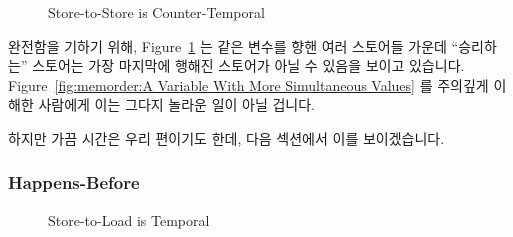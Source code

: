 \begin{figure}[tbp]
\centering
{}
\caption{Store-to-Store is Counter-Temporal}
\label{fig:memorder:Store-to-Store is Counter-Temporal}
\end{figure}

완전함을 기하기 위해,
Figure~\ref{fig:memorder:Store-to-Store is Counter-Temporal}
는 같은 변수를 향핸 여러 스토어들 가운데 ``승리하는'' 스토어는 가장 마지막에
행해진 스토어가 아닐 수 있음을 보이고 있습니다.
Figure~\ref{fig:memorder:A Variable With More Simultaneous Values} 를 주의깊게
이해한 사람에게 이는 그다지 놀라운 일이 아닐 겁니다.

하지만 가끔 시간은 우리 편이기도 한데, 다음 섹션에서 이를 보이겠습니다.

\subsubsection{Happens-Before}
\label{sec:memorder:Happens-Before}

\begin{figure}[tbp]
\centering
{}
\caption{Store-to-Load is Temporal}
\label{fig:memorder:Store-to-Load is Temporal}
\end{figure}

